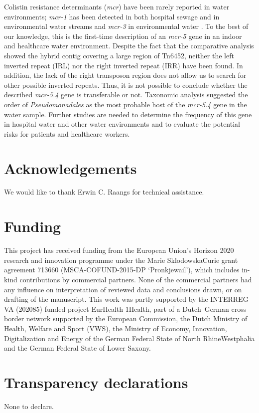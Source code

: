 Colistin resistance determinants (\textit{mcr}) have been rarely reported in water environments; \textit{mcr-1} has been detected in both hospital sewage and in environmental water streams and \textit{mcr-3} in environmental water \citep{zhao_incp_2017, tuo_prevalence_2018}.
To the best of our knowledge, this is the first-time description of an \textit{mcr-5} gene in an indoor and healthcare water environment. 
Despite the fact that the comparative analysis showed the hybrid contig covering a large region of Tn6452, neither the left inverted repeat (IRL) nor the right inverted repeat (IRR) have been found. 
In addition, the lack of the right transposon region does not allow us to search for other possible inverted repeats. 
Thus, it is not possible to conclude whether the described \textit{mcr-5.4} gene is transferable or not. 
Taxonomic analysis suggested the order of \textit{Pseudomonadales} as the most probable host of the \textit{mcr-5.4} gene in the water sample. 
Further studies are needed to determine the frequency of this gene in hospital water and other water environments and to evaluate the potential risks for patients and healthcare workers.

\section{Acknowledgements}

We would like to thank Erwin C. Raangs for technical assistance.

\section{Funding}

This project has received funding from the European Union’s Horizon
2020 research and innovation programme under the Marie SklodowskaCurie grant agreement 713660 (MSCA-COFUND-2015-DP ‘Pronkjewail’),
which includes in-kind contributions by commercial partners. None of
the commercial partners had any influence on interpretation of reviewed
data and conclusions drawn, or on drafting of the manuscript. This work
was partly supported by the INTERREG VA (202085)-funded project
EurHealth-1Health, part of a Dutch–German cross-border network supported by the European Commission, the Dutch Ministry of Health,
Welfare and Sport (VWS), the Ministry of Economy, Innovation,
Digitalization and Energy of the German Federal State of North RhineWestphalia and the German Federal State of Lower Saxony.

\section{Transparency declarations}

None to declare.